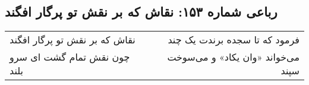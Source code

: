 \begin{center}
\section*{رباعی شماره ۱۵۳: نقاش که بر نقش تو پرگار افگند}
\label{sec:sh153}
\begin{longtable}{l p{0.5cm} r}
نقاش که بر نقش تو پرگار افگند
&&
فرمود که تا سجده برندت یک چند
\\
چون نقش تمام گشت ای سرو بلند
&&
می‌خواند «وان یکاد» و می‌سوخت سپند
\\
\end{longtable}
\end{center}

